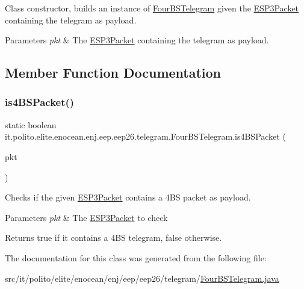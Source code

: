 Class constructor, builds an instance of \hyperlink{classit_1_1polito_1_1elite_1_1enocean_1_1enj_1_1eep_1_1eep26_1_1telegram_1_1_four_b_s_telegram}{Four\+B\+S\+Telegram} given the \hyperlink{}{E\+S\+P3\+Packet} containing the telegram as payload.


\begin{DoxyParams}{Parameters}
{\em pkt} & The \hyperlink{}{E\+S\+P3\+Packet} containing the telegram as payload. \\
\hline
\end{DoxyParams}


\subsection{Member Function Documentation}
\hypertarget{classit_1_1polito_1_1elite_1_1enocean_1_1enj_1_1eep_1_1eep26_1_1telegram_1_1_four_b_s_telegram_ab92be94cdd410654fdba69f55bdb7257}{}\label{classit_1_1polito_1_1elite_1_1enocean_1_1enj_1_1eep_1_1eep26_1_1telegram_1_1_four_b_s_telegram_ab92be94cdd410654fdba69f55bdb7257} 
\subsubsection{\texorpdfstring{is4\+B\+S\+Packet()}{is4BSPacket()}}
{\footnotesize\ttfamily static boolean it.\+polito.\+elite.\+enocean.\+enj.\+eep.\+eep26.\+telegram.\+Four\+B\+S\+Telegram.\+is4\+B\+S\+Packet (\begin{DoxyParamCaption}\item[{\hyperlink{classit_1_1polito_1_1elite_1_1enocean_1_1protocol_1_1serial_1_1v3_1_1network_1_1packet_1_1_e_s_p3_packet}{E\+S\+P3\+Packet}}]{pkt }\end{DoxyParamCaption})\hspace{0.3cm}{\ttfamily [static]}}

Checks if the given \hyperlink{}{E\+S\+P3\+Packet} contains a 4\+BS packet as payload.


\begin{DoxyParams}{Parameters}
{\em pkt} & The \hyperlink{}{E\+S\+P3\+Packet} to check \\
\hline
\end{DoxyParams}
\begin{DoxyReturn}{Returns}
true if it contains a 4\+BS telegram, false otherwise. 
\end{DoxyReturn}


The documentation for this class was generated from the following file\+:\begin{DoxyCompactItemize}
\item 
src/it/polito/elite/enocean/enj/eep/eep26/telegram/\hyperlink{_four_b_s_telegram_8java}{Four\+B\+S\+Telegram.\+java}\end{DoxyCompactItemize}
